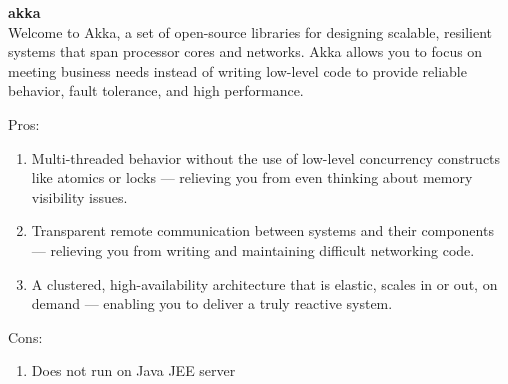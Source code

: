 
		\textbf{akka} \\
		Welcome to Akka, a set of open-source libraries for designing scalable, resilient systems that span processor cores and networks. Akka allows you to focus on meeting business needs instead of writing low-level code to provide reliable behavior, fault tolerance, and high performance.
		
				Pros:
		\begin{enumerate}
			\item Multi-threaded behavior without the use of low-level concurrency constructs like atomics or locks — relieving you from even thinking about memory visibility issues.
			\item Transparent remote communication between systems and their components — relieving you from writing and maintaining difficult networking code.
			\item A clustered, high-availability architecture that is elastic, scales in or out, on demand — enabling you to deliver a truly reactive system.
		\end{enumerate}
		Cons:
		\begin{enumerate}
			\item Does not run on Java JEE server
		\end{enumerate}